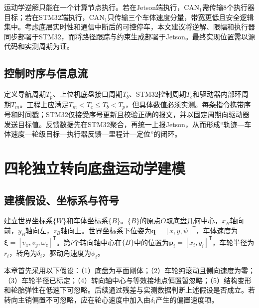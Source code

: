 \documentclass[UTF8,openany,12pt,a4paper]{ctexrep}
\newcommand{\trans}{^{\mathsf T}}
\begin{document}
运动学逆解只能在一个计算节点执行。若在Jetson端执行，CAN$_1$需传输8个执行器目标；若在STM32端执行，CAN$_1$只传输三个车体速度分量，带宽更低且安全逻辑集中。考虑底层实时性和通信中断后的可控停车，本文建议将逆解、限幅和执行器同步部署于STM32，而将路径跟踪与约束生成部署于Jetson。最终实现位置需以源代码和实测周期为证。

\section{控制时序与信息流}
定义导航周期$T_p$、上位机底盘接口周期$T_b$、STM32控制周期$T_c$和驱动器内部环周期$T_m$。工程上应满足$T_m<T_c\leq T_b<T_p$，但具体数值必须实测。每条指令携带序号和时间戳；STM32仅接受序号更新且校验正确的报文，并以固定周期向驱动器发送目标值。反馈数据先在STM32聚合，再统一上报Jetson，从而形成“轨迹—车体速度—轮级目标—执行器反馈—里程计—定位”的闭环。

\chapter{四轮独立转向底盘运动学建模}
\section{建模假设、坐标系与符号}
建立世界坐标系$\{W\}$和车体坐标系$\{B\}$。$\{B\}$的原点$O$取底盘几何中心，$x_B$轴向前，$y_B$轴向左，$z_B$轴向上。世界坐标系下位姿为$\bm q=[x,y,\psi]\trans$，车体速度为$\bm\xi=[v_x,v_y,\omega_z]\trans$。第$i$个转向轴中心在$\{B\}$中的位置为$\bm p_i=[x_i,y_i]\trans$，车轮半径为$r_i$，转角为$\delta_i$，驱动角速度为$\dot\phi_i$。

本章首先采用以下假设：（1）底盘为平面刚体；（2）车轮纯滚动且侧向速度为零；（3）车轮半径已标定；（4）转向轴中心与等效接地点偏置暂忽略；（5）结构变形和轮胎弹性在低速下可忽略。后续通过残差与实测数据判断上述假设是否成立。若转向主销偏置不可忽略，应在轮心速度中加入由$\dot\delta_i$产生的偏置速度项。
\end{document}
